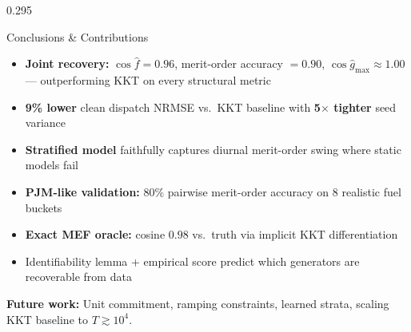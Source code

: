 \documentclass[final]{beamer}
\begin{document}
\begin{frame}[t]{}
\begin{columns}[t, totalwidth=\textwidth]
\begin{column}{0.295\textwidth}
  \begin{alertblock}{Conclusions \& Contributions}
    \begin{itemize}
      \item \textbf{Joint recovery:} $\cos\hat f = 0.96$, merit-order
            accuracy $= 0.90$, $\cos\hat g_{\max} \approx 1.00$
            — outperforming KKT on every structural metric
      \item \textbf{9\% lower} clean dispatch NRMSE vs.\ KKT baseline
            with \textbf{5$\times$ tighter} seed variance
      \item \textbf{Stratified model} faithfully captures diurnal
            merit-order swing where static models fail
      \item \textbf{PJM-like validation:} 80\% pairwise merit-order
            accuracy on 8 realistic fuel buckets
      \item \textbf{Exact MEF oracle:} cosine $0.98$ vs.\ truth via
            implicit KKT differentiation
      \item Identifiability lemma + empirical score predict which
            generators are recoverable from data
    \end{itemize}

    \medskip
    \textbf{Future work:} Unit commitment, ramping constraints, learned
    strata, scaling KKT baseline to $T\gtrsim10^4$.
  \end{alertblock}

\end{column}

\end{columns}

\end{frame}
\end{document}
